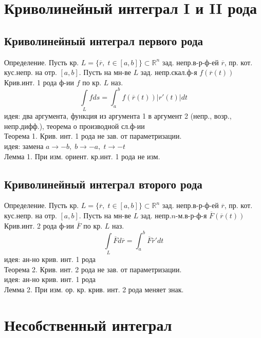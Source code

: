\documentclass{article}
\begin{document}
\newpage
\section{Криволинейный интеграл I и II рода}
\subsection{Криволинейный интеграл первого рода}
Определение. Пусть кр. $L = \{ \overline{r}, \; t \in [a,b] \} \subset \mathbb R^n$ зад. непр.в-р-ф-ей $\overline{r}$, пр. кот. кус.непр. на отр. $[a,b]$. Пусть на мн-ве $L$ зад. непр.скал.ф-я $f(\overline{r}(t))$ \\
Крив.инт. 1 рода ф-ии $f$ по кр. $L$ наз. \\
\begin{equation*}
    \underset{L}{\int} fds = \int_a^b f(\overline{r}(t))|r'(t)|dt
\end{equation*}
идея: два аргумента, функция из аргумента 1 в аргумент 2 (непр., возр., непр.дифф.), теорема о производной сл.ф-ии \\
Теорема 1. Крив. инт. 1 рода не зав. от параметризации. \\
идея: замена $a \rightarrow -b, \; b \rightarrow -a, \; t \rightarrow -t$ \\
Лемма 1. При изм. ориент. кр.инт. 1 рода не изм.
\subsection{Криволинейный интеграл второго рода}
Определение. Пусть кр. $L = \{ \overline{r}, \; t \in [a,b] \} \subset \mathbb R^n$ зад. непр.в-р-ф-ей $\overline{r}$, пр. кот. кус.непр. на отр. $[a,b]$. Пусть на мн-ве $L$ зад. непр.$n$-м.в-р-ф-я $\overline{F}(\overline{r}(t))$ \\
Крив.инт. 2 рода ф-ии $\overline F$ по кр. $L$ наз. \\
\begin{equation*}
    \underset{L}{\int} \overline F d \overline r = \int_a^b \overline F \overline r' dt
\end{equation*}
идея: ан-но крив. инт. 1 рода \\
Теорема 2. Крив. инт. 2 рода не зав. от параметризации. \\
идея: ан-но крив. инт. 1 рода \\
Лемма 2. При изм. ор. кр. крив. инт. 2 рода меняет знак.


\newpage
\section{Несобственный интеграл}
\end{document}
